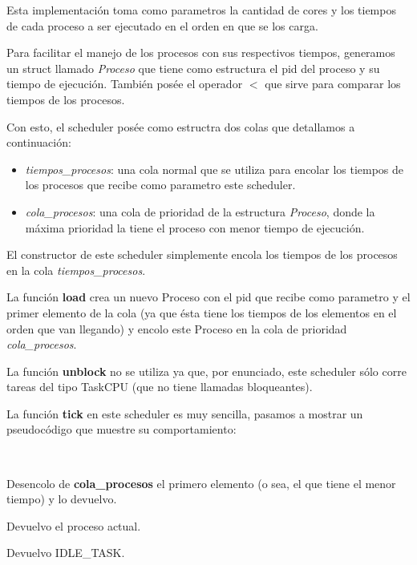 Esta implementación toma como parametros la cantidad de cores y los tiempos de cada proceso a ser ejecutado en el orden en que se los carga.

Para facilitar el manejo de los procesos con sus respectivos tiempos, generamos un struct llamado \emph{Proceso} que tiene como estructura el pid del proceso y su tiempo de ejecución. También posée el operador $<$ que sirve para comparar los tiempos de los procesos.

Con esto, el scheduler posée como estructra dos colas que detallamos a continuación:

\begin{itemize}

\item \emph{tiempos\_procesos}: una cola normal que se utiliza para encolar los tiempos de los procesos que recibe como parametro este scheduler.

\item \emph{cola\_procesos}: una cola de prioridad de la estructura \emph{Proceso}, donde la máxima prioridad la tiene el proceso con menor tiempo de ejecución.

\end{itemize}

El constructor de este scheduler simplemente encola los tiempos de los procesos en la cola \emph{tiempos\_procesos}.

La función \textbf{load} crea un nuevo Proceso con el pid que recibe como parametro y el primer elemento de la cola (ya que ésta tiene los tiempos de los elementos en el orden que van llegando) y encolo este Proceso en la cola de prioridad \emph{cola\_procesos}.

La función \textbf{unblock} no se utiliza ya que, por enunciado, este scheduler sólo corre tareas del tipo TaskCPU (que no tiene llamadas bloqueantes).

La función \textbf{tick} en este scheduler es muy sencilla, pasamos a mostrar un pseudocódigo que muestre su comportamiento:

~

\begin{algorithmic}

		\State Desencolo de \textbf{cola\_procesos} el primero elemento (o sea, el que tiene el menor tiempo) y lo devuelvo.
	
		\State Devuelvo el proceso actual.

	\Else
		\State Devuelvo IDLE\_TASK.
	\EndIf
\EndFunction	
\end{algorithmic}


